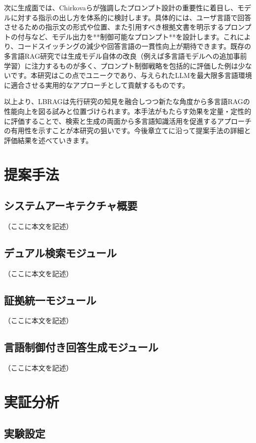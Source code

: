 \documentclass[12pt]{bxjsreport}
\begin{document}
次に生成面では、Chirkovaらが強調したプロンプト設計の重要性に着目し、モデルに対する指示の出し方を体系的に検討します。具体的には、ユーザ言語で回答させるための指示文の形式や位置、また引用すべき根拠文書を明示するプロンプトの付与など、モデル出力を**制御可能なプロンプト**を設計します。これにより、コードスイッチングの減少や回答言語の一貫性向上が期待できます。既存の多言語RAG研究では生成モデル自体の改良（例えば多言語モデルへの追加事前学習）に注力するものが多く、プロンプト制御戦略を包括的に評価した例は少ないです。本研究はこの点でユニークであり、与えられたLLMを最大限多言語環境に適合させる実用的なアプローチとして貢献するものです。

以上より、LBRAGは先行研究の知見を融合しつつ新たな角度から多言語RAGの性能向上を図る試みと位置づけられます。本手法がもたらす効果を定量・定性的に評価することで、検索と生成の両面から多言語知識活用を促進するアプローチの有用性を示すことが本研究の狙いです。今後章立てに沿って提案手法の詳細と評価結果を述べていきます。

\chapter{提案手法}

\section{システムアーキテクチャ概要}
（ここに本文を記述）

\section{デュアル検索モジュール}
（ここに本文を記述）

\section{証拠統一モジュール}
（ここに本文を記述）

\section{言語制御付き回答生成モジュール}
（ここに本文を記述）

\chapter{実証分析}

\section{実験設定}
\end{document}
